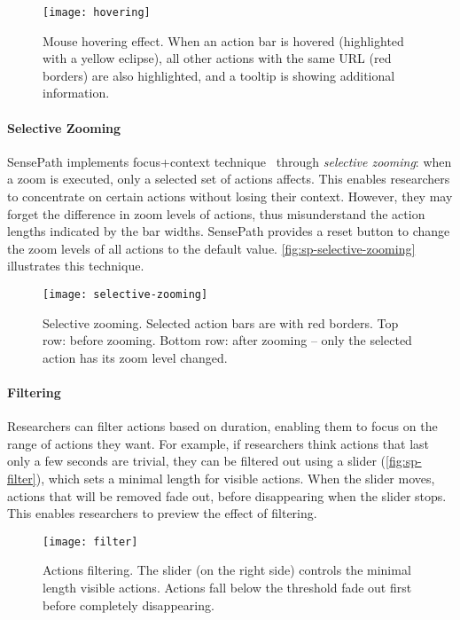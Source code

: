 \begin{figure}[!htb]
\centering
\texttt{[image: hovering]}
\caption[Mouse hovering effect]{Mouse hovering effect. When an action bar is hovered (highlighted with a yellow eclipse), all other actions with the same URL (red borders) are also highlighted, and a tooltip is showing additional information.}
\label{fig:sp-hovering}
\end{figure}

\paragraph{Selective Zooming}
SensePath implements focus+context technique~\cite{Cockburn2008} through \emph{selective zooming}: when a zoom is executed, only a selected set of actions affects. This enables researchers to concentrate on certain actions without losing their context. However, they may forget the difference in zoom levels of actions, thus misunderstand the action lengths indicated by the bar widths. SensePath provides a reset button to change the zoom levels of all actions to the default value. \autoref{fig:sp-selective-zooming} illustrates this technique.

\begin{figure}[!htb]
\centering
\texttt{[image: selective-zooming]}
\caption[Selective zooming]{Selective zooming. Selected action bars are with red borders. Top row: before zooming. Bottom row: after zooming -- only the selected action has its zoom level changed.}
\label{fig:sp-selective-zooming}
\end{figure}

\paragraph{Filtering}
Researchers can filter actions based on duration, enabling them to focus on the range of actions they want. For example, if researchers think actions that last only a few seconds are trivial, they can be filtered out using a slider (\autoref{fig:sp-filter}), which sets a minimal length for visible actions. When the slider moves, actions that will be removed fade out, before disappearing when the slider stops. This enables researchers to preview the effect of filtering.

\begin{figure}[!htb]
\centering
\texttt{[image: filter]}
\caption[Actions filtering]{Actions filtering. The slider (on the right side) controls the minimal length visible actions. Actions fall below the threshold fade out first before completely disappearing.}
\label{fig:sp-filter}
\end{figure}

